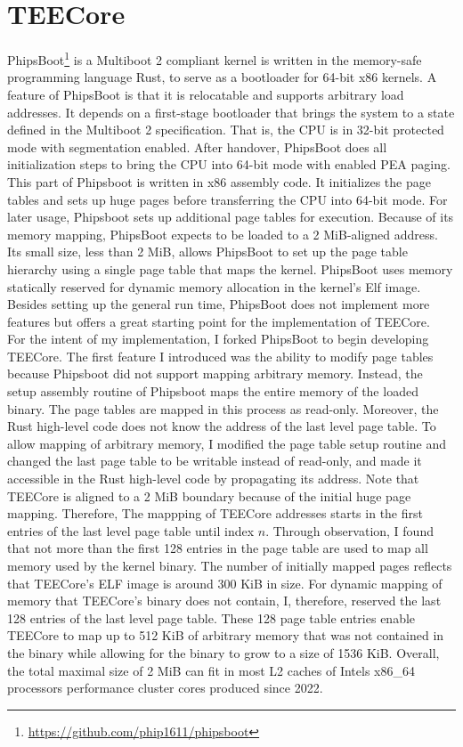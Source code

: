 \section{TEECore}
\label{sec:implementation:teeKernel}
PhipsBoot\footnote{\url{https://github.com/phip1611/phipsboot}} is a Multiboot 2
compliant kernel is written in the memory-safe programming language Rust, to
serve as a bootloader for 64-bit x86 kernels. A feature of PhipsBoot is that it
is relocatable and supports arbitrary load addresses. It depends on a
first-stage bootloader that
brings the system to a state defined in the Multiboot 2 specification. That is,
the CPU is in 32-bit protected mode with segmentation enabled. After handover,
PhipsBoot does all initialization steps to bring the CPU into 64-bit mode with
enabled PEA paging. This part of Phipsboot is written in x86 assembly code. It
initializes the page tables and sets up huge pages before transferring the CPU
into 64-bit mode. For later usage, Phipsboot sets up additional page tables for
execution. Because of its memory mapping, PhipsBoot expects to be loaded to a 2
MiB-aligned address. Its small size, less than 2 MiB, allows PhipsBoot to set
up the page table hierarchy using a single page table that maps the kernel.
PhipsBoot uses memory statically reserved for dynamic memory allocation in the
kernel's Elf image. Besides setting up the general run time, PhipsBoot does not
implement more features but offers a great starting point for the implementation
of TEECore. \\

For the intent of my implementation, I forked PhipsBoot to begin developing
TEECore. The first feature I introduced was the ability to modify page tables
because Phipsboot did not support mapping arbitrary memory. Instead, the setup
assembly routine of Phipsboot maps the entire memory of the loaded binary. The
page tables are mapped in this process as read-only. Moreover, the Rust
high-level code does not know the address of the last level page table. To allow
mapping of arbitrary memory, I modified the page table setup routine and changed
the last page table to be writable instead of read-only, and made it accessible
in the Rust high-level code by propagating its address. Note that TEECore is
aligned to a 2 MiB boundary because of the initial huge page mapping. Therefore,
The mappping of TEECore addresses starts in the first entries of the last level
page table until index $n$. Through observation, I found that not more than the
first 128 entries in the page table are used to map all memory used by the
kernel binary. The number of initially mapped pages reflects that TEECore's ELF
image is around 300 KiB in size. For dynamic mapping of memory that TEECore's
binary does not contain, I, therefore, reserved the last 128 entries of the last
level page table. These 128 page table entries enable  TEECore to map up to 512
KiB of arbitrary memory that was not contained in the binary while allowing for
the binary to grow to a size of 1536 KiB. Overall, the total maximal size of 2
MiB can fit in most L2 caches of Intels x86\_64 processors performance cluster
cores produced since 2022.\\

